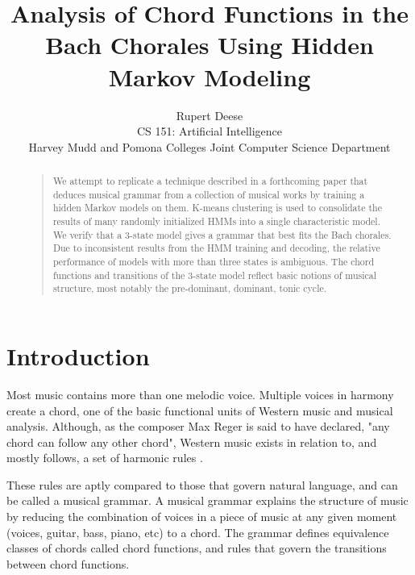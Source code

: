 \documentclass[letterpaper]{article}
\begin{document}
%
\title{Analysis of Chord Functions in the Bach Chorales Using Hidden Markov Modeling}
\author{Rupert Deese\\
CS 151: Artificial Intelligence\\
Harvey Mudd and Pomona Colleges Joint Computer Science Department\\
}
\maketitle
\begin{abstract}
\begin{quote}
We attempt to replicate a technique described in a forthcoming paper that deduces musical grammar from a collection of musical works by training a hidden Markov models on them. K-means clustering is used to consolidate the results of many randomly initialized HMMs into a single characteristic model. We verify that a 3-state model gives a grammar that best fits the Bach chorales. Due to inconsistent results from the HMM training and decoding, the relative performance of models with more than three states is ambiguous. The chord functions and transitions of the 3-state model reflect basic notions of musical structure, most notably the pre-dominant, dominant, tonic cycle.
\end{quote}
\end{abstract}

\section{Introduction}
Most music contains more than one melodic voice. Multiple voices in harmony create a chord, one of the basic functional units of Western music and musical analysis. Although, as the composer Max Reger is said to have declared, "any chord can follow any other chord", Western music exists in relation to, and mostly follows, a set of harmonic rules \cite{harrison1994harmonic}.

These rules are aptly compared to those that govern natural language, and can be called a musical grammar. A musical grammar explains the structure of music by reducing the combination of voices in a piece of music at any given moment (voices, guitar, bass, piano, etc) to a chord. The grammar defines equivalence classes of chords called chord functions, and rules that govern the transitions between chord functions.
\end{document}
